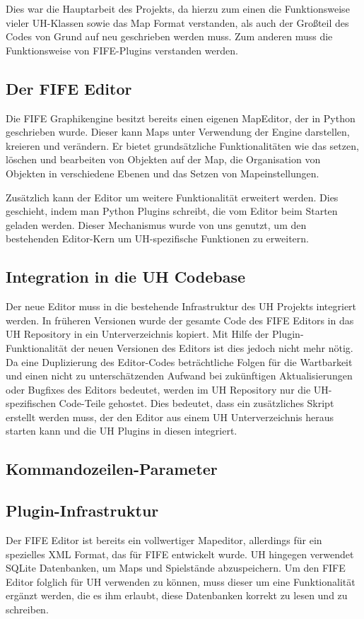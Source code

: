 Dies war die Hauptarbeit des Projekts, da hierzu zum einen die Funktionsweise vieler
UH-Klassen sowie das Map Format verstanden, als auch der Großteil des Codes von Grund
auf neu geschrieben werden muss. Zum anderen muss die Funktionsweise von FIFE-Plugins
verstanden werden.

\subsection{Der FIFE Editor}
Die FIFE Graphikengine besitzt bereits einen eigenen MapEditor, der in Python geschrieben
wurde. Dieser kann Maps unter
Verwendung der Engine darstellen, kreieren und verändern. Er bietet grundsätzliche
Funktionalitäten wie das setzen, löschen und bearbeiten von Objekten auf der Map,
die Organisation von Objekten in verschiedene Ebenen und das Setzen von Mapeinstellungen.

Zusätzlich kann der Editor um weitere Funktionalität erweitert werden. Dies geschieht,
indem man Python Plugins schreibt, die vom Editor beim Starten geladen werden. Dieser
Mechanismus wurde von uns genutzt, um den bestehenden Editor-Kern um UH-spezifische
Funktionen zu erweitern.

\subsection{Integration in die UH Codebase}
Der neue Editor muss in die bestehende Infrastruktur des UH Projekts integriert werden.
In früheren Versionen wurde der gesamte Code des FIFE Editors in das UH Repository
in ein Unterverzeichnis kopiert. Mit Hilfe der Plugin-Funktionalität der neuen Versionen
des Editors ist dies jedoch nicht mehr nötig. Da eine Duplizierung des Editor-Codes
beträchtliche Folgen für die Wartbarkeit und einen nicht zu unterschätzenden Aufwand
bei zukünftigen Aktualisierungen oder Bugfixes des Editors bedeutet, werden im UH
Repository nur die UH-spezifischen Code-Teile gehostet. Dies bedeutet, dass ein
zusätzliches Skript erstellt werden muss, der den Editor aus einem UH Unterverzeichnis
heraus starten kann und die UH Plugins in diesen integriert.

\subsection{Kommandozeilen-Parameter}

\subsection{Plugin-Infrastruktur}
Der FIFE Editor ist bereits ein vollwertiger Mapeditor, allerdings für ein spezielles XML Format,
das für FIFE entwickelt wurde. UH hingegen verwendet SQLite Datenbanken, um Maps und Spielstände
abzuspeichern. Um den FIFE Editor folglich für UH verwenden zu können, muss dieser um eine
Funktionalität ergänzt werden, die es ihm erlaubt, diese Datenbanken korrekt zu lesen und zu schreiben.

